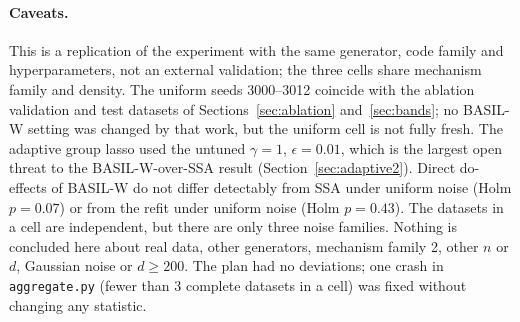 \paragraph{Caveats.} This is a replication of the experiment with the same generator, code family and hyperparameters, not an external validation; the three cells share mechanism family and density. The uniform seeds 3000--3012 coincide with the ablation validation and test datasets of Sections~\ref{sec:ablation} and~\ref{sec:bands}; no BASIL-W setting was changed by that work, but the uniform cell is not fully fresh. The adaptive group lasso used the untuned $\gamma=1$, $\epsilon=0.01$, which is the largest open threat to the BASIL-W-over-SSA result (Section~\ref{sec:adaptive2}). Direct do-effects of BASIL-W do not differ detectably from SSA under uniform noise (Holm $p=0.07$) or from the refit under uniform noise (Holm $p=0.43$). The datasets in a cell are independent, but there are only three noise families. Nothing is concluded here about real data, other generators, mechanism family 2, other $n$ or $d$, Gaussian noise or $d\ge200$. The plan had no deviations; one crash in \texttt{aggregate.py} (fewer than 3 complete datasets in a cell) was fixed without changing any statistic.
